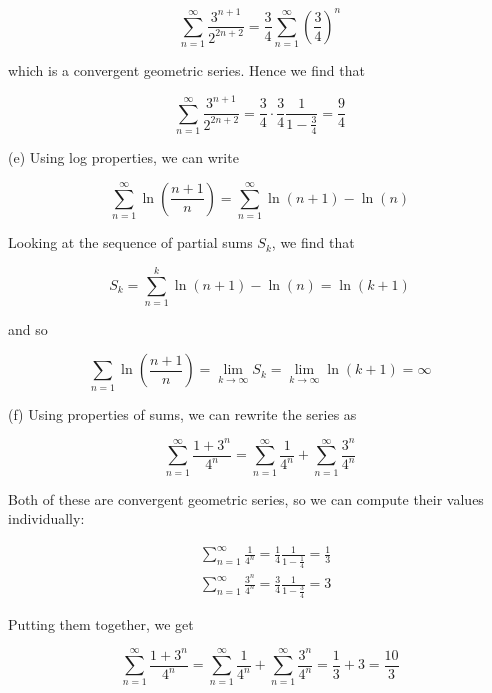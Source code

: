 \documentclass[10pt]{article}
\begin{document}
$$
\sum_{n=1}^{\infty} \frac{3^{n+1}}{2^{2 n+2}}=\frac{3}{4} \sum_{n=1}^{\infty}\left(\frac{3}{4}\right)^{n}
$$

which is a convergent geometric series. Hence we find that

$$
\sum_{n=1}^{\infty} \frac{3^{n+1}}{2^{2 n+2}}=\frac{3}{4} \cdot \frac{3}{4} \frac{1}{1-\frac{3}{4}}=\frac{9}{4}
$$

(e) Using log properties, we can write

$$
\sum_{n=1}^{\infty} \ln \left(\frac{n+1}{n}\right)=\sum_{n=1}^{\infty} \ln (n+1)-\ln (n)
$$

Looking at the sequence of partial sums $S_{k}$, we find that

$$
S_{k}=\sum_{n=1}^{k} \ln (n+1)-\ln (n)=\ln (k+1)
$$

and so

$$
\sum_{n=1} \ln \left(\frac{n+1}{n}\right)=\lim _{k \rightarrow \infty} S_{k}=\lim _{k \rightarrow \infty} \ln (k+1)=\infty
$$

(f) Using properties of sums, we can rewrite the series as

$$
\sum_{n=1}^{\infty} \frac{1+3^{n}}{4^{n}}=\sum_{n=1}^{\infty} \frac{1}{4^{n}}+\sum_{n=1}^{\infty} \frac{3^{n}}{4^{n}}
$$

Both of these are convergent geometric series, so we can compute their values individually:

$$
\begin{aligned}
& \sum_{n=1}^{\infty} \frac{1}{4^{n}}=\frac{1}{4} \frac{1}{1-\frac{1}{4}}=\frac{1}{3} \\
& \sum_{n=1}^{\infty} \frac{3^{n}}{4^{n}}=\frac{3}{4} \frac{1}{1-\frac{3}{4}}=3
\end{aligned}
$$

Putting them together, we get

$$
\sum_{n=1}^{\infty} \frac{1+3^{n}}{4^{n}}=\sum_{n=1}^{\infty} \frac{1}{4^{n}}+\sum_{n=1}^{\infty} \frac{3^{n}}{4^{n}}=\frac{1}{3}+3=\frac{10}{3}
$$
\end{document}

